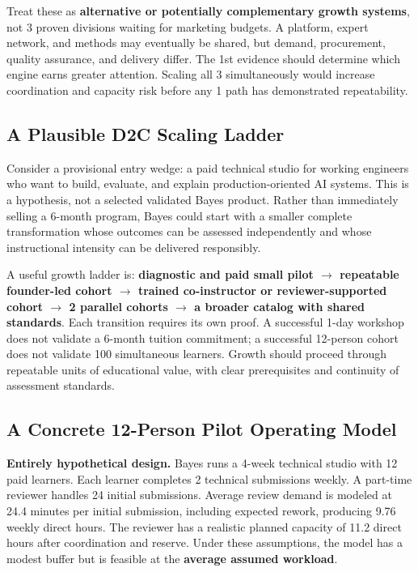 Treat these as \textbf{alternative or potentially complementary growth systems}, not 3 proven divisions waiting for marketing budgets. A platform, expert network, and methods may eventually be shared, but demand, procurement, quality assurance, and delivery differ. The 1st evidence should determine which engine earns greater attention. Scaling all 3 simultaneously would increase coordination and capacity risk before any 1 path has demonstrated repeatability.

\subsection{A Plausible D2C Scaling Ladder}
\label{sec:plausible_d2c_scaling_ladder}

Consider a provisional entry wedge: a paid technical studio for working engineers who want to build, evaluate, and explain production-oriented AI systems. This is a hypothesis, not a selected validated Bayes product. Rather than immediately selling a 6-month program, Bayes could start with a smaller complete transformation whose outcomes can be assessed independently and whose instructional intensity can be delivered responsibly.

A useful growth ladder is: \textbf{diagnostic and paid small pilot $\to$ repeatable founder-led cohort $\to$ trained co-instructor or reviewer-supported cohort $\to$ 2 parallel cohorts $\to$ a broader catalog with shared standards}. Each transition requires its own proof. A successful 1-day workshop does not validate a 6-month tuition commitment; a successful 12-person cohort does not validate 100 simultaneous learners. Growth should proceed through repeatable units of educational value, with clear prerequisites and continuity of assessment standards.

\subsection{A Concrete 12-Person Pilot Operating Model}
\label{sec:concrete_12_person_pilot_model}

\textbf{Entirely hypothetical design.} Bayes runs a 4-week technical studio with 12 paid learners. Each learner completes 2 technical submissions weekly. A part-time reviewer handles 24 initial submissions. Average review demand is modeled at 24.4 minutes per initial submission, including expected rework, producing 9.76 weekly direct hours. The reviewer has a realistic planned capacity of 11.2 direct hours after coordination and reserve. Under these assumptions, the model has a modest buffer but is feasible at the \textbf{average assumed workload}.

